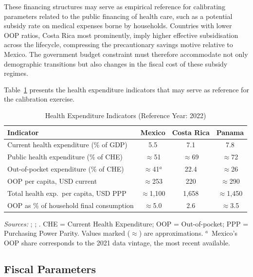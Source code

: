 \documentclass[12pt,a4paper]{article}
\begin{document}
These financing structures may serve as empirical reference for
calibrating parameters related to the public financing of health care,
such as a potential subsidy rate on medical expenses borne by
households. Countries with
lower OOP ratios, Costa Rica most prominently, imply higher effective
subsidisation across the lifecycle, compressing the precautionary
savings motive relative to Mexico. The government budget constraint
must therefore accommodate not only demographic transitions but also
changes in the fiscal cost of these subsidy regimes.

Table~\ref{tab:health_exp} presents the health expenditure indicators
that may serve as reference for the calibration exercise.

\begin{table}[htbp]
\centering
\caption{Health Expenditure Indicators (Reference Year: 2022)}
\label{tab:health_exp}
\begin{tabular}{lccc}
\hline\hline
\textbf{Indicator} & \textbf{Mexico} & \textbf{Costa Rica} & \textbf{Panama} \\
\hline
Current health expenditure (\% of GDP)       & 5.5          & 7.1   & 7.8   \\
Public health expenditure (\% of CHE)        & $\approx$51  & $\approx$69 & $\approx$72 \\
Out-of-pocket expenditure (\% of CHE)        & $\approx$41$^{a}$ & 22.4 & $\approx$26 \\
OOP per capita, USD current                  & $\approx$253 & 220   & $\approx$290 \\
Total health exp.\ per capita, USD PPP       & $\approx$1{,}100 & 1{,}658 & $\approx$1{,}450 \\
OOP as \% of household final consumption     & $\approx$5.0 & 2.6   & $\approx$3.5 \\
\hline\hline
\end{tabular}
\begin{minipage}{\linewidth}
\smallskip
\footnotesize
\textit{Sources:} \citet{WHOGHED2024}; \citet{OECDHaG2023};
\citet{WHOGHO2024}. CHE = Current Health Expenditure; OOP =
Out-of-pocket; PPP = Purchasing Power Parity. Values marked
($\approx$) are approximations. $^{a}$~Mexico's OOP share
corresponds to the 2021 data vintage, the most recent available.
\end{minipage}
\end{table}

\subsection{Fiscal Parameters}\label{subsec:fiscal}
\end{document}
